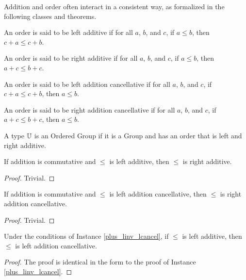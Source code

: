 \documentclass[../../math.tex]{subfiles}
\begin{document}
Addition and order often interact in a consistent way, as formalized in the
following classes and theorems.

\begin{class}
    An order is said to be left additive if for all $a$, $b$, and $c$, if $a
    \leq b$, then $c + a \leq c + b$.
\end{class}

\begin{class}
    An order is said to be right additive if for all $a$, $b$, and $c$, if $a
    \leq b$, then $a + c \leq b + c$.
\end{class}

\begin{class}
    An order is said to be left addition cancellative if for all $a$, $b$, and
    $c$, if $c + a \leq c + b$, then $a \leq b$.
\end{class}

\begin{class}
    An order is said to be right addition cancellative if for all $a$, $b$, and
    $c$, if $a + c \leq b + c$, then $a \leq b$.
\end{class}

\begin{class}
    A type $\mathbb{U}$ is an Ordered Group if it is a Group and has an order that is
    left and right additive.
\end{class}

\begin{instance}
    If addition is commutative and $\leq$ is left additive, then $\leq$ is right
    additive.
\end{instance}
\begin{proof}
    Trivial.
\end{proof}

\begin{instance}
    If addition is commutative and $\leq$ is left addition cancellative, then
    $\leq$ is right addition cancellative.
\end{instance}
\begin{proof}
    Trivial.
\end{proof}

\begin{instance}
    Under the conditions of Instance \ref{plus_linv_lcancel}, if $\leq$ is left
    additive, then $\leq$ is left addition cancellative.
\end{instance}
\begin{proof}
    The proof is identical in the form to the proof of Instance
    \ref{plus_linv_lcancel}.
\end{proof}
\end{document}
